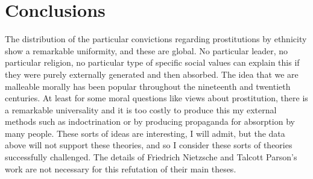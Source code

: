 \documentclass{amsart}
\begin{document}
\section{Conclusions}
The distribution of the particular convictions regarding prostitutions by ethnicity show a remarkable uniformity, and these are global.  No particular leader, no particular religion, no particular type of specific social values can explain this if they were purely externally generated and then absorbed.  The idea that we are malleable morally has been popular throughout the nineteenth and twentieth centuries.  At least for some moral questions like views about prostitution, there is a remarkable universality and it is too costly to produce this my external methods such as indoctrination or by producing propaganda for absorption by many people.  These sorts of ideas are interesting, I will admit, but the data above will not support these theories, and so I consider these sorts of theories successfully challenged.  The details of Friedrich Nietzsche and Talcott Parson's work are not necessary for this refutation of their main theses.
\end{document}
